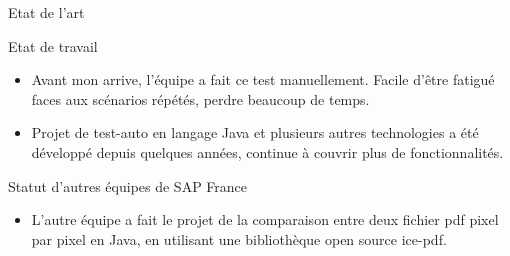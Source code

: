 \documentclass{beamer}
\begin{document}
        \begin{frame}{Etat de l'art}
            \begin{block}{Etat de travail}
                \begin{itemize}
                    \item Avant mon arrive, l'équipe a fait ce test manuellement. Facile d’être fatigué faces aux scénarios répétés, perdre beaucoup de temps. 
                    \item Projet de test-auto en langage Java et plusieurs autres technologies a été développé depuis quelques années, continue à couvrir plus de fonctionnalités.
                \end{itemize}
            \end{block}
            \pause
            
            \begin{block}{Statut d'autres équipes de SAP France}
                \begin{itemize}
                    \item L'autre équipe a fait le projet de la comparaison entre deux fichier pdf pixel par pixel en Java, en utilisant une bibliothèque open source ice-pdf.
                \end{itemize}
            \end{block}
            
        \end{frame}
        
\end{document}
